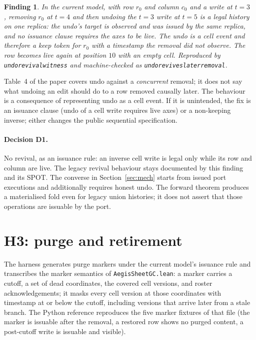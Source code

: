 \documentclass[11pt]{article}
\newtheorem{finding}[definition]{Finding}
\newcommand{\lean}[1]{\texttt{\def\_{\textunderscore\allowbreak}#1}}
\begin{document}
\begin{finding}
In the current model, with row $r_0$ and column $c_0$ and a write at $t=3$,
removing $r_0$ at $t=4$ and then undoing the $t=3$ write at $t=5$ is a legal
history on one replica: the undo's target is observed and was issued by the
same replica, and no issuance clause requires the axes to be live. The undo
is a cell event and therefore a keep token for $r_0$ with a timestamp the
removal did not observe. The row becomes live again at position $10$ with an
empty cell. Reproduced by \lean{undo\_revival\_witness} and machine-checked
as \lean{undo\_revives\_later\_removal}.
\end{finding}

Table~4 of the paper covers undo against a \emph{concurrent} removal; it
does not say what undoing an edit should do to a row removed causally later.
The behaviour is a consequence of representing undo as a cell event. If it is
unintended, the fix is an issuance clause (undo of a cell write requires live
axes) or a non-keeping inverse; either changes the public sequential
specification.

\paragraph{Decision D1.} No revival, as an issuance rule: an inverse cell
write is legal only while its row and column are live. The legacy revival
behaviour stays documented by this finding and its SPOT. The converse in
Section~\ref{sec:mech} starts from issued port executions and additionally
requires honest undo. The forward theorem produces a materialised fold even
for legacy union histories; it does not assert that those operations are
issuable by the port.

\section{H3: purge and retirement}
\label{sec:h3}

The harness generates purge markers under the current model's issuance rule
and transcribes the marker semantics of \lean{AegisSheetGC.lean}: a marker
carries a cutoff, a set of dead coordinates, the covered cell versions, and
roster acknowledgements; it masks every cell version at those coordinates
with timestamp at or below the cutoff, including versions that arrive later
from a stale branch. The Python reference reproduces the five marker fixtures
of that file (the marker is issuable after the removal, a restored row shows
no purged content, a post-cutoff write is issuable and visible).
\end{document}
